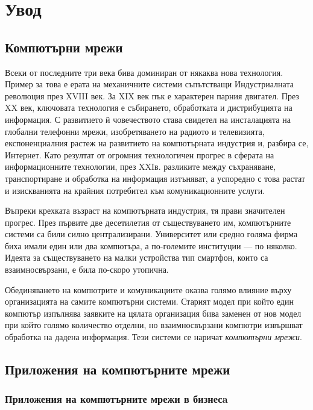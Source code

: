 \documentclass[12pt,a4paper,oneside]{book}
\begin{document}
\pagestyle{empty}

\pagestyle{plain}
\listoftodos

\tableofcontents
\vfill
\chapter*{Увод}

\section{Компютърни мрежи}

Всеки от последните три века бива доминиран от някаква нова технология. Пример
за това е ерата на механичните системи съпътстващи Индустриалната революция през
XVIII век. За XIX век пък е характерен парния двигател. През XX век, ключовата
технология е събирането, обработката и дистрибуцията на информация. С развитието
й човечеството става свидетел на инсталацията на глобални телефонни мрежи,
изобретяването на радиото и телевизията, експоненциалния растеж на развитието на
компютърната индустрия и, разбира се, Интернет. Като резултат от огромния
технологичен прогрес в сферата на информационните технологии, през XXIв.
разликите между съхраняване, транспортиране и обработка на информация изтъняват,
а успоредно с това растат и изискванията на крайния потребител към
комуникационните услуги.

Въпреки крехката възраст на компютърната индустрия, тя прави значителен прогрес.
През първите две десетилетия от съществуването им, компютърните системи са били
силно централизирани.  Университет или средно голяма фирма биха имали един или
два компютъра, а по-големите институции --- по няколко. Идеята за съществуването
на малки устройства тип смартфон, които са взаимносвързани, е била по-скоро утопична.

Обединяването на компютрите и комуникациите оказва голямо влияние върху
организацията на самите компютърни системи. Старият модел при който един
компютър изпълнява заявките на цялата организация бива заменен от нов модел при
който голямо количество отделни, но взаимносвързани компютри извършват обработка
на дадена информация. Тези системи се наричат \textit{компютърни мрежи}.
\cite{tanenbaum_computer_2011}

\section{Приложения на компютърните мрежи}

\subsection{Приложения на компютърните мрежи в бизнесa}
\end{document}
